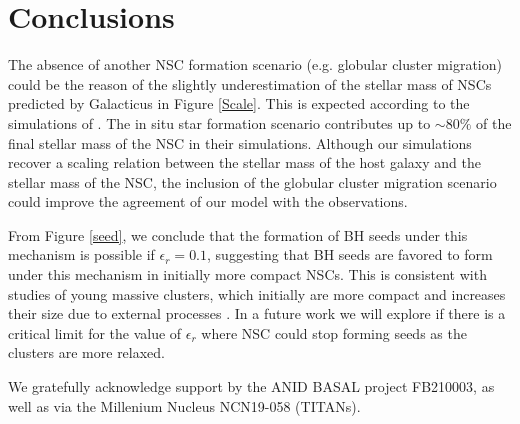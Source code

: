 \documentclass[baaa]{baaa}
\begin{document}
\section{Conclusions}

The absence of another NSC formation scenario (e.g. globular cluster migration) could be the reason of the slightly underestimation of the stellar mass of NSCs predicted by {\sc Galacticus} in Figure \ref{Scale}. This is expected according to the simulations of \cite{ANTONINI2015}. The in situ star formation scenario contributes up to $\sim 80\%$ of the final stellar mass of the NSC in their simulations.  Although our simulations recover a scaling relation between the stellar mass of the host galaxy and the stellar mass of the NSC, the inclusion of the globular cluster migration scenario \citep{ANTONINI2015} could improve the agreement of our model with the observations.

From Figure \ref{seed}, we conclude that the formation of BH seeds under this mechanism is possible if $\epsilon_r=0.1$, suggesting that BH seeds are favored to form under this mechanism in initially more compact NSCs. This is consistent with studies of young massive clusters, which initially are more compact and increases their size due to external processes \citep{KROUPA2017}. In a future work we will explore if there is a critical limit for the value of $\epsilon_r$ where NSC could stop forming seeds as the clusters are more relaxed. 

\begin{acknowledgement}
We gratefully acknowledge support by the ANID BASAL project FB210003, as well as via the Millenium Nucleus NCN19-058 (TITANs).
\end{acknowledgement}



\small

 
\end{document}
